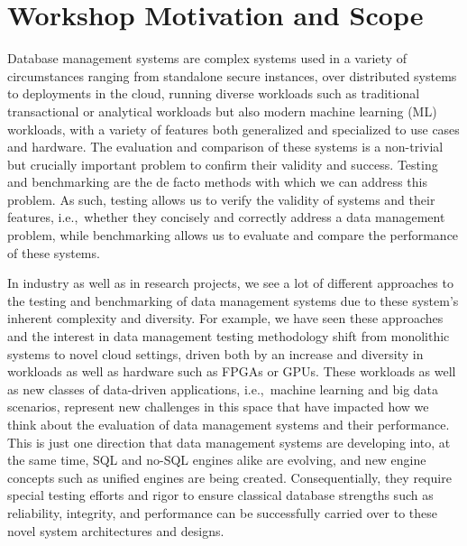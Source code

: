 \documentclass[sigconf]{acmart}
\begin{document}
\maketitle

\section{Workshop Motivation and Scope}
Database management systems are complex systems used in a variety of circumstances ranging from standalone secure instances, over distributed systems to deployments in the cloud, running diverse workloads such as traditional transactional or analytical workloads but also modern machine learning (ML) workloads, with a variety of features both generalized and specialized to use cases and hardware.
The evaluation and comparison of these systems is a non-trivial but crucially important problem to confirm their validity and success.
Testing and benchmarking are the de facto methods with which we can address this problem.
As such, testing allows us to verify the validity of systems and their features, i.e.,~whether they concisely and correctly address a data management problem, while benchmarking allows us to evaluate and compare the performance of these systems.

In industry as well as in research projects, we see a lot of different approaches to the testing and benchmarking of data management systems due to these system's inherent complexity and diversity.
For example, we have seen these approaches and the interest in data management testing methodology shift from monolithic systems to novel cloud settings, driven both by an increase and diversity in workloads as well as hardware such as FPGAs or GPUs.
These workloads as well as new classes of data-driven applications, i.e.,~machine learning and big data scenarios, represent new challenges in this space that have impacted how we think about the evaluation of data management systems and their performance.
This is just one direction that data management systems are developing into, at the same time, SQL and no-SQL engines alike are evolving, and new engine concepts such as unified engines are being created.
Consequentially, they require special testing efforts and rigor to ensure classical database strengths such as reliability, integrity, and performance can be successfully carried over to these novel system architectures and designs.
\end{document}
